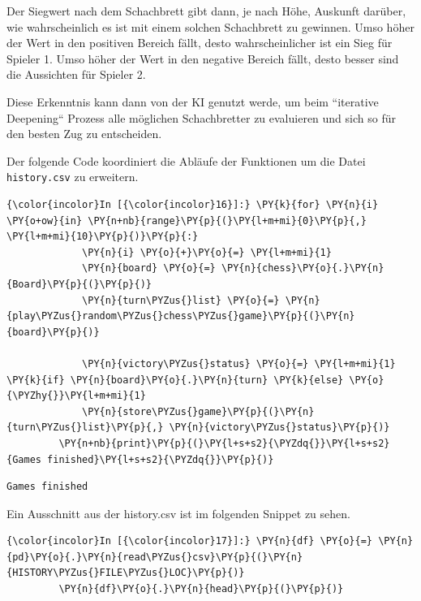     Der Siegwert nach dem Schachbrett gibt dann, je nach Höhe, Auskunft
darüber, wie wahrscheinlich es ist mit einem solchen Schachbrett zu
gewinnen. Umso höher der Wert in den positiven Bereich fällt, desto
wahrscheinlicher ist ein Sieg für Spieler 1. Umso höher der Wert in den
negative Bereich fällt, desto besser sind die Aussichten für Spieler 2.

Diese Erkenntnis kann dann von der KI genutzt werde, um beim ``iterative
Deepening`` Prozess alle möglichen Schachbretter zu evaluieren und sich
so für den besten Zug zu entscheiden.

Der folgende Code koordiniert die Abläufe der Funktionen um die Datei
\texttt{history.csv} zu erweitern.

    \begin{Verbatim}[commandchars=\\\{\}]
{\color{incolor}In [{\color{incolor}16}]:} \PY{k}{for} \PY{n}{i} \PY{o+ow}{in} \PY{n+nb}{range}\PY{p}{(}\PY{l+m+mi}{0}\PY{p}{,} \PY{l+m+mi}{10}\PY{p}{)}\PY{p}{:}
             \PY{n}{i} \PY{o}{+}\PY{o}{=} \PY{l+m+mi}{1}
             \PY{n}{board} \PY{o}{=} \PY{n}{chess}\PY{o}{.}\PY{n}{Board}\PY{p}{(}\PY{p}{)}
             \PY{n}{turn\PYZus{}list} \PY{o}{=} \PY{n}{play\PYZus{}random\PYZus{}chess\PYZus{}game}\PY{p}{(}\PY{n}{board}\PY{p}{)}
         
             \PY{n}{victory\PYZus{}status} \PY{o}{=} \PY{l+m+mi}{1} \PY{k}{if} \PY{n}{board}\PY{o}{.}\PY{n}{turn} \PY{k}{else} \PY{o}{\PYZhy{}}\PY{l+m+mi}{1}
             \PY{n}{store\PYZus{}game}\PY{p}{(}\PY{n}{turn\PYZus{}list}\PY{p}{,} \PY{n}{victory\PYZus{}status}\PY{p}{)}
         \PY{n+nb}{print}\PY{p}{(}\PY{l+s+s2}{\PYZdq{}}\PY{l+s+s2}{Games finished}\PY{l+s+s2}{\PYZdq{}}\PY{p}{)}
\end{Verbatim}


    \begin{Verbatim}[commandchars=\\\{\}]
Games finished

    \end{Verbatim}

    Ein Ausschnitt aus der history.csv ist im folgenden Snippet zu sehen.

    \begin{Verbatim}[commandchars=\\\{\}]
{\color{incolor}In [{\color{incolor}17}]:} \PY{n}{df} \PY{o}{=} \PY{n}{pd}\PY{o}{.}\PY{n}{read\PYZus{}csv}\PY{p}{(}\PY{n}{HISTORY\PYZus{}FILE\PYZus{}LOC}\PY{p}{)}
         \PY{n}{df}\PY{o}{.}\PY{n}{head}\PY{p}{(}\PY{p}{)}
\end{Verbatim}


